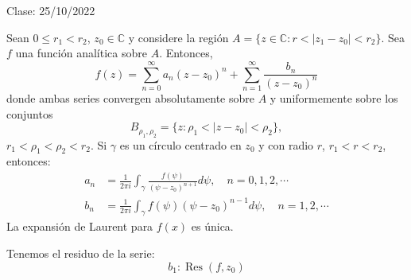 Clase: 25/10/2022

\begin{teorema}[Laurent]
    Sean $0\leq r_1<r_2$, $z_0\in \mathbb{C}$ y considere la región $A=\{z\in \mathbb{C}: r<|z_1-z_0|<r_2\}$. Sea $f$ una función analítica sobre $A$. Entonces, 
    $$f(z)=\sum_{n=0}^\infty a_n(z-z_0)^n + \sum_{n=1}^\infty \frac{b_n}{(z-z_0)^n}$$
    donde ambas series convergen absolutamente sobre $A$ y uniformemente sobre los conjuntos 
    $$B_{\rho_1,\rho_2}=\{z:\rho_1<|z-z_0|<\rho_2\},$$
    $r_1<\rho_1<\rho_2<r_2$. Si $\gamma$ es un círculo centrado en $z_0$ y con radio $r$, $r_1<r<r_2$, entonces:
    \begin{align*}
        a_n&=\frac{1}{2\pi i}\int_\gamma \frac{f(\psi)}{(\psi -z_0)^{n+1}}d\psi, \quad n=0,1,2,\cdots\\
        b_n&= \frac{1}{2\pi i}\int_\gamma f(\psi)(\psi -z_0)^{n-1}d\psi,\quad n=1,2,\cdots
    \end{align*}
    La expansión de Laurent para $f(x)$ es única. 
    \begin{cajita}
        Tenemos el residuo de la serie:
        $$b_1:\operatorname{Res}(f,z_0)$$
    \end{cajita}
\end{teorema}

